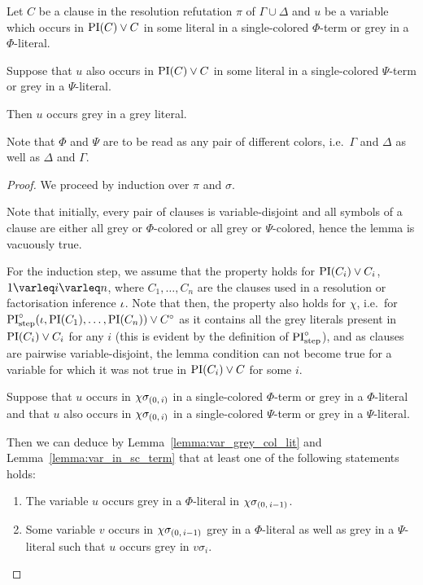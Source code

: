 \documentclass[,%
	draft=false,%
	numbers=noendperiod
	12pt,
	a4paper,
	oneside,%
	openany,
]{memoir}
\newcommand{\inv}{\ensuremath{\chi}}
\begin{document}
\begin{lemma}
	\label{lemma:col_change_and_grey_in_col_lit}
	Let $C$ be a clause in the resolution refutation $\pi$ of $\Gamma \cup \Delta$
	and $u$ be a variable which occurs in $\operatorname{PI}(C)\lor C$ in some literal in a single-colored $\Phi$-term or grey in a $\Phi$-literal.

	Suppose that $u$ also occurs in $\operatorname{PI}(C) \lor C$ in some literal in a single-colored $\Psi$-term or grey in a $\Psi$-literal.

	Then $u$ occurs grey in a grey literal.
\end{lemma}
Note that $\Phi$ and $\Psi$ are to be read as any pair of different colors, i.e.\ $\Gamma$ and $\Delta$ as well as $\Delta$ and $\Gamma$.
\begin{proof}
	We proceed by induction over $\pi$ and $\sigma$. 

	Note that initially, every pair of clauses is variable-disjoint and all symbols of a clause are either all grey or $\Phi$-colored or all grey or $\Psi$-colored, hence the lemma is vacuously true.

	For the induction step,
	we assume that the property holds for $\operatorname{PI}(C_i) \lor C_i$, $1\varleq i \varleq n$, where $C_1, \dots, C_n$ are the clauses used in a resolution or factorisation inference $\iota$.
	Note that then, the property also holds for $\inv$, i.e.\ for $\operatorname{PI}^\circ_{\mathrm{step}}(\iota, \operatorname{PI}(C_1), \dots, \operatorname{PI}(C_n)) \lor C^\circ$ as it contains all the grey literals present in $\operatorname{PI}(C_i) \lor C_i$ for any $i$ (this is evident by the definition of $\operatorname{PI}^\circ_{\mathrm{step}}$), and as clauses are pairwise variable-disjoint, the lemma condition can not become true for a variable for which it was not true in $\operatorname{PI}(C_i)\lor C$ for some $i$.


	Suppose that $u$ occurs in $\chi\sigma_{(0,\,i)}$ in a single-colored $\Phi$-term or grey in a $\Phi$-literal and 
	that $u$ also occurs in $\chi\sigma_{(0,\,i)}$ in a single-colored $\Psi$-term or grey in a $\Psi$-literal.

	Then we can deduce by Lemma~\ref{lemma:var_grey_col_lit} and Lemma~\ref{lemma:var_in_sc_term} that at least one of the following statements holds:
	\begin{enumerate}
		\item
			\label{oozoh7Oh1}
			The variable $u$ occurs grey in a $\Phi$-literal in $\inv\sigmazmi$.

		\item 
			\label{oozoh7Oh2}
			Some variable $v$ occurs in $\inv\sigmazmi$ grey in a $\Phi$-literal as well as grey in a $\Psi$-literal such that $u$ occurs grey in $v\sigma_i$.


\end{enumerate}
\end{proof}
\end{document}
